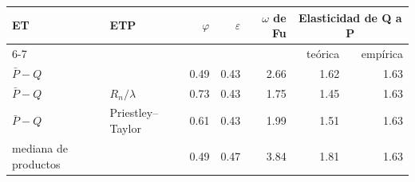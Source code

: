 \begin{tabular}{llrrrrr}
\toprule
ET & ETP & $\varphi$ & $\varepsilon$ & $\omega$ de Fu & \multicolumn{2}{c}{Elasticidad de Q a P} \\
\cmidrule(lr){6-7}
 & & & & & teórica & empírica \\
\midrule
$\bar{P} - Q$ & \ETo{} \PM{} & 0.49 & 0.43 & 2.66 & 1.62 & 1.63 \\
$\bar{P} - Q$ & $R_n/\lambda$ & 0.73 & 0.43 & 1.75 & 1.45 & 1.63 \\
$\bar{P} - Q$ & Priestley--Taylor & 0.61 & 0.43 & 1.99 & 1.51 & 1.63 \\
mediana de productos & \ETo{} \PM{} & 0.49 & 0.47 & 3.84 & 1.81 & 1.63 \\
\bottomrule
\end{tabular}
